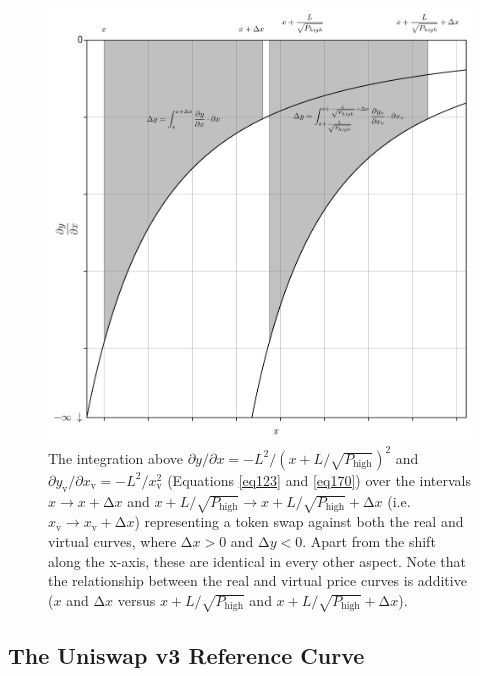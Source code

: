 \documentclass{article}
\begin{document}
\begin{figure}[ht]
    \centering
    \includegraphics[width=\textwidth]{fig31.png}
    \captionsetup{
        justification=raggedright,
        singlelinecheck=false,
        font=small,
        labelfont=bf,
        labelsep=quad,
        format=plain
    }
    \caption{The integration above $\partial y / \partial x = - L^{2} / \left( x + L / \sqrt{P_{\text{high}}} \right)^{2}$ and $\partial y_{\text{v}} / \partial x_{\text{v}} = - L^{2} / x_{\text{v}}^{2}$ (Equations \ref{eq123} and \ref{eq170}) over the intervals $x \rightarrow x + \mathrm{\Delta}x$ and $x + L / \sqrt{P_{\text{high}}} \rightarrow x + L / \sqrt{P_{\text{high}}} + \mathrm{\Delta}x$ (i.e. $x_{\text{v}} \rightarrow x_{\text{v}} + \mathrm{\Delta}x$) representing a token swap against both the real and virtual curves, where $\mathrm{\Delta}x > 0$ and $\mathrm{\Delta}y < 0$. Apart from the shift along the x-axis, these are identical in every other aspect. Note that the relationship between the real and virtual price curves is additive ($x$ and  $\mathrm{\Delta}x$ versus $x + L / \sqrt{P_{\text{high}}}$ and 
    $x + L / \sqrt{P_{\text{high}}} + \mathrm{\Delta}x$).}
    \label{fig31}
\end{figure}

\subsection{The Uniswap v3 Reference Curve}\label{subsec4.3}
\end{document}
